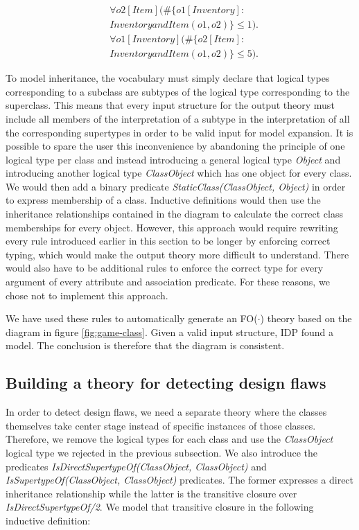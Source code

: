 \documentclass[conference]{IEEEtran}
\begin{document}
\begin{align*}
	&\forall{o2}[Item](\#\{o1[Inventory] : \\ &InventoryandItem(o1, o2)\} \leq 1). \\
	&\forall{o1}[Inventory](\#\{o2[Item] : \\ &InventoryandItem(o1, o2)\} \leq 5).
\end{align*}

To model inheritance, the vocabulary must simply declare that logical types corresponding to a subclass are subtypes of the logical type corresponding to the superclass. This means that every input structure for the output theory must include all members of the interpretation of a subtype in the interpretation of all the corresponding supertypes in order to be valid input for model expansion. It is possible to spare the user this inconvenience by abandoning the principle of one logical type per class and instead introducing a general logical type \textit{Object} and introducing another logical type \textit{ClassObject} which has one object for every class. We would then add a binary predicate \textit{StaticClass(ClassObject, Object)} in order to express membership of a class. Inductive definitions would then use the inheritance relationships contained in the diagram to calculate the correct class memberships for every object. However, this approach would require rewriting every rule introduced earlier in this section to be longer by enforcing correct typing, which would make the output theory more difficult to understand. There would also have to be additional rules to enforce the correct type for every argument of every attribute and association predicate. For these reasons, we chose not to implement this approach.

We have used these rules to automatically generate an FO($\cdot$) theory based on the diagram in figure \ref{fig:game-class}. Given a valid input structure, IDP found a model. The conclusion is therefore that the diagram is consistent.

\subsection{Building a theory for detecting design flaws}\label{sec:design-flaw}

In order to detect design flaws, we need a separate theory where the classes themselves take center stage instead of specific instances of those classes. Therefore, we remove the logical types for each class and use the \textit{ClassObject} logical type we rejected in the previous subsection. We also introduce the predicates \textit{IsDirectSupertypeOf(ClassObject, ClassObject)} and \textit{IsSupertypeOf(ClassObject, ClassObject)} predicates. The former expresses a direct inheritance relationship while the latter is the transitive closure over \textit{IsDirectSupertypeOf/2}. We model that transitive closure in the following inductive definition:
\end{document}
